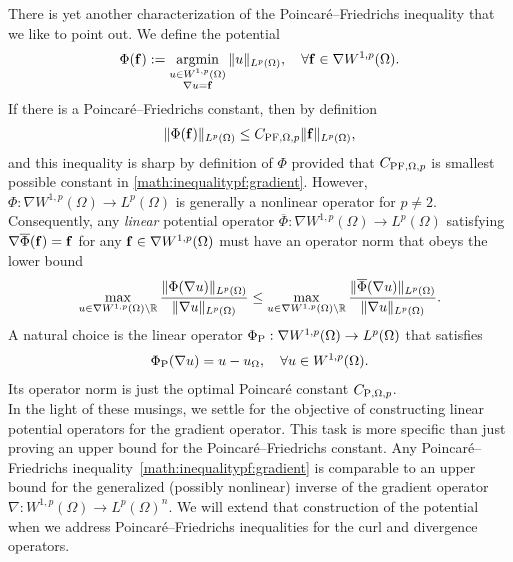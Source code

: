 \documentclass[12pt,a4paper]{article}
\begin{document}
There is yet another characterization of the Poincar\'e--Friedrichs inequality that we like to point out. 
We define the potential 
\begin{align*}
    \Phi( {\mathbf f} ) := \operatorname*{{\rm argmin}}\limits_{ \substack{ u \in W^{1,p}(\Omega) \\ \nabla u = {\mathbf f} } } \| u \|_{L^{p}(\Omega)},
    \quad 
    \forall 
    {\mathbf f} \in \nabla W^{1,p}(\Omega)
    .
\end{align*}
If there is a Poincar\'e--Friedrichs constant, then by definition
\begin{align*}
    \| \Phi({\mathbf f}) \|_{L^p(\Omega)} \leq C_{{\rm PF},\Omega,p} \| {\mathbf f} \|_{L^p(\Omega)},
\end{align*}
and this inequality is sharp by definition of $\Phi$ provided that $C_{{\rm PF},\Omega,p}$ is smallest possible constant in \eqref{math:inequalitypf:gradient}. 
However, $\Phi : \nabla W^{1,p}(\Omega) \rightarrow L^p(\Omega)$ is generally a nonlinear operator for $p \neq 2$. 
Consequently, any \textit{linear} potential operator $\overline\Phi : \nabla W^{1,p}(\Omega) \rightarrow L^p(\Omega)$
satisfying $\nabla \overline\Phi( {\mathbf f} ) = {\mathbf f}$ for any ${\mathbf f} \in \nabla W^{1,p}(\Omega)$ must have an operator norm that obeys the lower bound 
\begin{align*}
    \max\limits_{ u \in \nabla W^{1,p}(\Omega) \setminus {\mathbb R} } 
    \frac{ \| \Phi(\nabla u) \|_{L^p(\Omega)} }{ \| \nabla u \|_{L^p(\Omega)} }
    \leq 
    \max\limits_{ u \in \nabla W^{1,p}(\Omega) \setminus {\mathbb R} } 
    \frac{ \| \overline\Phi(\nabla u) \|_{L^p(\Omega)} }{ \| \nabla u \|_{L^p(\Omega)} }
    .
\end{align*}
A natural choice is the linear operator $\Phi_{{\rm P}} : \nabla W^{1,p}(\Omega) \rightarrow L^p(\Omega)$ that satisfies 
\begin{align*}
    \Phi_{{\rm P}}( \nabla u ) = u - u_{\Omega},
    \quad 
    \forall 
    u \in W^{1,p}(\Omega)
    .
\end{align*}
Its operator norm is just the optimal Poincar\'e constant $C_{{\rm P},\Omega,p}$.
\\

In the light of these musings, we settle for the objective of constructing linear potential operators for the gradient operator.
This task is more specific than just proving an upper bound for the Poincar\'e--Friedrichs constant. 
Any Poincar\'e--Friedrichs inequality~\eqref{math:inequalitypf:gradient} is comparable to an upper bound for the generalized (possibly nonlinear) inverse of the gradient operator $\nabla : W^{1,p}(\Omega) \rightarrow L^{p}(\Omega)^{n}$. 
We will extend that construction of the potential when we address Poincar\'e--Friedrichs inequalities for the curl and divergence operators. 
\end{document}
